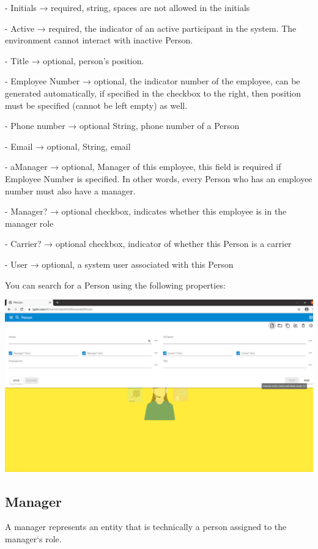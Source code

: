 - Initials →  required, string, spaces are not allowed in the initials

- Active → required, the indicator of an active participant in the system. The environment cannot interact with inactive Person.

- Title →  optional, person’s position.

- Employee Number → optional, the indicator number of the employee, can be generated automatically, if specified in the checkbox to the right, then position must be specified (cannot be left empty) as well. 

- Phone number → optional String, phone number of a Person

- Email →  optional, String, email

- aManager →  optional, Manager of this employee, this field is required if Employee Number is specified. In other words, every Person who has an employee number must also have a manager.

- Manager? →  optional checkbox, indicates whether this employee is in the manager role

- Carrier? → optional checkbox, indicator of whether this Person is a carrier

- User → optional, a system user associated with this Person

You can search for a Person using the following properties: 

\includegraphics[width=\textwidth]{sections/01-chapter/images/person4.png}

\subsection{Manager}
A manager represents an entity that is technically a person assigned to the manager`s role.

